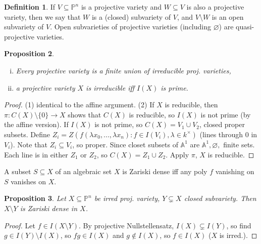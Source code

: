 \documentclass{article}
\theoremstyle{definition}
\newtheorem{defn}{Definition}[section]
\theoremstyle{remark}
\theoremstyle{plain}
\newtheorem{prop}[defn]{Proposition}
\newcommand{\PP}{\mathbb{P}}
\newcommand{\bA}{\mathbb{A}}
\begin{document}
\begin{defn}
    If $V\subseteq\PP^n$ is a projective variety and $W\subseteq  V$ is also a projective variety, then we say that $W$ is a (closed) subvariety of $V$, and $V\setminus W$ is an open subvariety of $V$. Open subvarieties of projective varieties (including $\varnothing$) are quasi-projective varieties.
\end{defn}
\begin{prop}\
    \begin{enumerate}[(i)]
        \item Every projective variety is a finite union of irreducible proj. varieties,
        \item a projective variety $X$ is irreducible iff $I(X)$ is prime.
    \end{enumerate}
\end{prop}
\begin{proof}
    (1) identical to the affine argument. (2) If $X$ is reducible, then $\pi:C(X)\setminus\{0\}\to X$ shows that $C(X)$ is reducible, so $I(X)$ is not prime (by the affine version). If $I(X)$ is not prime, so $C(X)=V_1\cup V_2$, closed proper subsets. Define $Z_i=Z(f(\lambda x_0,...,\lambda x_n):f\in I(V_i),\lambda\in k^\times)$ (lines through $0$ in $V_i$). Note that $Z_i\subseteq V_i$, so proper. Since closet subsets of $\bA^1$ are $\bA^1,\varnothing,$ finite sets. Each line is in either $Z_1$ or $Z_2$, so $C(X)=Z_1\cup Z_2$. Apply $\pi$, $X$ is reducible.
\end{proof}
A subset $S\subseteq X$ of an algebraic set $X$ is Zariski dense iff any poly $f$ vanishing on $S$ vanishes on $X$.
\begin{prop}
    Let $X\subseteq\PP^n$ be irred proj. variety, $Y\subsetneq X$ closed subvariety. Then $X\setminus Y$ is Zariski dense in $X$.
\end{prop}
\begin{proof}
    Let $f\in I(X\setminus Y)$. By projective Nullstellensatz, $I(X)\subsetneq I(Y)$, so find $g\in I(Y)\setminus I(X)$, so $fg\in I(X)$ and $g\not\in I(X)$, so $f\in I(X)$ ($X$ is irred.).  
\end{proof}
\end{document}
